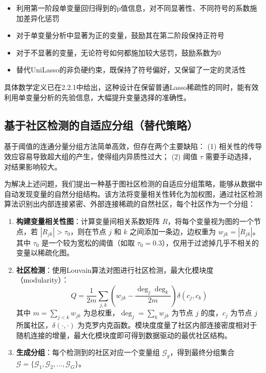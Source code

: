 \documentclass[12pt,a4paper]{article}
\begin{document}
\begin{itemize}
    \item 利用第一阶段单变量回归得到的p值信息，对不同显著性、不同符号的系数施加差异化惩罚
    \item 对于单变量分析中显著为正的变量，鼓励其在第二阶段保持正符号
    \item 对于不显著的变量，无论符号如何都施加较大惩罚，鼓励系数为0
    \item 替代UniLasso的非负硬约束，既保持了符号偏好，又保留了一定的灵活性
\end{itemize}

具体数学定义已在2.2.1中给出，这种设计在保留普通Lasso稀疏性的同时，能有效利用单变量分析的先验信息，大幅提升变量选择的准确性。

\subsection{基于社区检测的自适应分组（替代策略）}

基于阈值的连通分量分组方法简单高效，但存在两个主要缺陷：
(1) 相关性的传导效应容易导致超大组的产生，使得组内异质性过大；
(2) 阈值 $\tau$ 需要手动选择，对结果影响较大。

为解决上述问题，我们提出一种基于图社区检测的自适应分组策略，能够从数据中自动发现变量的自然分组结构。该方法将变量相关性转化为加权图，通过社区检测算法识别出内部连接紧密、外部连接稀疏的自然社区，每个社区作为一个分组：

\begin{enumerate}
    \item \textbf{构建变量相关性图}：计算变量间相关系数矩阵 $R$，将每个变量视为图的一个节点，若 $|R_{jk}| > \tau_0$，则在节点 $j$ 和 $k$ 之间添加一条边，边权重为 $w_{jk} = |R_{jk}|$。其中 $\tau_0$ 是一个较为宽松的阈值（如取 $\tau_0 = 0.3$），仅用于过滤掉几乎不相关的变量以稀疏化图。
    \item \textbf{社区检测}：使用Louvain算法\cite{blondel2008fast}对图进行社区检测，最大化模块度（modularity）：
    \[
    Q = \frac{1}{2m} \sum_{j,k} \left( w_{jk} - \frac{\deg_j \deg_k}{2m} \right) \delta(c_j, c_k)
    \]
    其中 $m = \sum_{j<k} w_{jk}$ 为总权重，$\deg_j = \sum_k w_{jk}$ 为节点 $j$ 的度，$c_j$ 为节点 $j$ 所属社区，$\delta(\cdot,\cdot)$ 为克罗内克函数。模块度度量了社区内部连接密度相对于随机连接的增量，最大化模块度即可得到数据驱动的最优社区结构。
    \item \textbf{生成分组}：每个检测到的社区对应一个变量组 $\mathcal{G}_g$，得到最终分组集合 $\mathcal{G} = \{\mathcal{G}_1, \mathcal{G}_2, \dots, \mathcal{G}_G\}$。
\end{enumerate}
\end{document}
